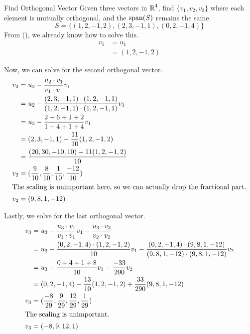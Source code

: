\begin{example}{Find Orthogonal Vector}
  Given three vectors in $\operatorname{\mathbb{R}}^{4}$, find $\lbrace v_{1}, v_{2}, v_{3} \rbrace$ where each element is mutually orthogonal, and the  $\operatorname{span}(S)$ remains the same.
  \begin{equation*}
    S = \lbrace (1, 2, -1, 2), (2, 3, -1, 1), (0, 2, -1, 4) \rbrace
  \end{equation*}
  \tcblower{}
  From  (), we already know how to solve this.
  \begin{align*}
    v_{1} &= u_{1} \\
          &= (1, 2, -1, 2)
  \end{align*}

  Now, we can solve for the second orthogonal vector.
  \begin{align*}
    v_{2} &= u_{2} - \frac{u_{2} \cdot v_{1}}{v_{1} \cdot v_{1}} v_{1} \\
          &= u_{2} - \frac{(2, 3, -1, 1) \cdot (1, 2, -1, 1)}{(1, 2, -1, 1) \cdot (1, 2, -1, 1)} v_{1} \\
          &= u_{2} - \frac{2 + 6 + 1 + 2}{1 + 4 + 1 + 4} v_{1} \\
          &= (2, 3, -1, 1) - \frac{11}{10} (1, 2, -1, 2) \\
          &= \frac{(20, 30, -10, 10) - 11 (1, 2, -1, 2)}{10} \\
    v_{2} &= (\frac{9}{10}, \frac{8}{10}, \frac{1}{10}, \frac{-12}{10}) \\
    \intertext{The scaling is unimportant here, so we can actually drop the fractional part.}
    v_{2} &= (9, 8, 1, -12)
  \end{align*}

  Lastly, we solve for the last orthogonal vector.
  \begin{align*}
    v_{3} &= u_{3} - \frac{u_{3} \cdot v_{1}}{v_{1} \cdot v_{1}} v_{1} - \frac{u_{3} \cdot v_{2}}{v_{2} \cdot v_{2}} \\
          &= u_{3} - \frac{(0, 2, -1, 4) \cdot (1, 2, -1, 2)}{10} v_{1} - \frac{(0, 2, -1, 4) \cdot (9, 8, 1, -12)}{(9,8,1,-12) \cdot (9,8,1,-12)} v_{2} \\
          &= u_{3} - \frac{0+4+1+8}{10} v_{1} - \frac{-33}{290} v_{2} \\
          &= (0, 2, -1, 4) - \frac{13}{10}(1,2,-1,2) + \frac{33}{290} (9, 8, 1, -12) \\
    v_{3} &= (\frac{-8}{29}, \frac{9}{29}, \frac{12}{29}, \frac{1}{29}) \\
    \intertext{The scaling is unimportant.}
    v_{3} &= (-8, 9, 12, 1)
  \end{align*}
\end{example}

